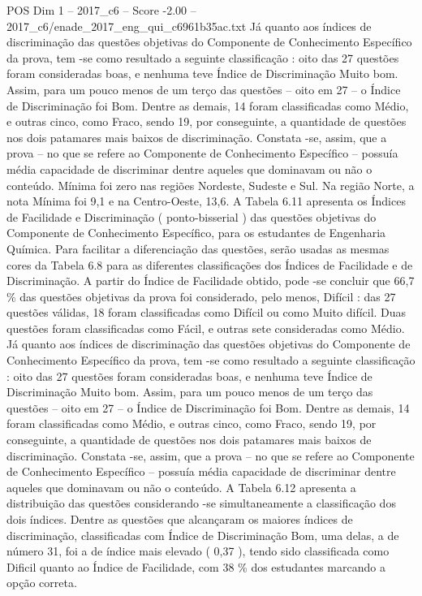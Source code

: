 \begin{textsample}{POS Dim 1 – 2017\_c6 – Score -2.00 – 2017\_c6/enade\_2017\_eng\_qui\_c6961b35ac.txt}
Já quanto aos índices de discriminação das questões objetivas do Componente de Conhecimento Específico da prova, tem -se como resultado a seguinte classificação : oito das 27 questões foram consideradas boas, e nenhuma teve Índice de Discriminação Muito bom.
Assim, para um pouco menos de um terço das questões – oito em 27 – o Índice de Discriminação foi Bom.
Dentre as demais, 14 foram classificadas como Médio, e outras cinco, como Fraco, sendo 19, por conseguinte, a quantidade de questões nos dois patamares mais baixos de discriminação.
Constata -se, assim, que a prova – no que se refere ao Componente de Conhecimento Específico – possuía média capacidade de discriminar dentre aqueles que dominavam ou não o conteúdo.
Mínima foi zero nas regiões Nordeste, Sudeste e Sul.
Na região Norte, a nota Mínima foi 9,1 e na Centro-Oeste, 13,6.
A Tabela 6.11 apresenta os Índices de Facilidade e Discriminação ( ponto-bisserial ) das questões objetivas do Componente de Conhecimento Específico, para os estudantes de Engenharia Química.
Para facilitar a diferenciação das questões, serão usadas as mesmas cores da Tabela 6.8 para as diferentes classificações dos Índices de Facilidade e de Discriminação.
A partir do Índice de Facilidade obtido, pode -se concluir que 66,7 \% das questões objetivas da prova foi considerado, pelo menos, Difícil : das 27 questões válidas, 18 foram classificadas como Difícil ou como Muito difícil.
Duas questões foram classificadas como Fácil, e outras sete consideradas como Médio.
Já quanto aos índices de discriminação das questões objetivas do Componente de Conhecimento Específico da prova, tem -se como resultado a seguinte classificação : oito das 27 questões foram consideradas boas, e nenhuma teve Índice de Discriminação Muito bom.
Assim, para um pouco menos de um terço das questões – oito em 27 – o Índice de Discriminação foi Bom.
Dentre as demais, 14 foram classificadas como Médio, e outras cinco, como Fraco, sendo 19, por conseguinte, a quantidade de questões nos dois patamares mais baixos de discriminação.
Constata -se, assim, que a prova – no que se refere ao Componente de Conhecimento Específico – possuía média capacidade de discriminar dentre aqueles que dominavam ou não o conteúdo.
A Tabela 6.12 apresenta a distribuição das questões considerando -se simultaneamente a classificação dos dois índices.
Dentre as questões que alcançaram os maiores índices de discriminação, classificadas com Índice de Discriminação Bom, uma delas, a de número 31, foi a de índice mais elevado ( 0,37 ), tendo sido classificada como Dificil quanto ao Índice de Facilidade, com 38 \% dos estudantes marcando a opção correta.

\end{textsample}

